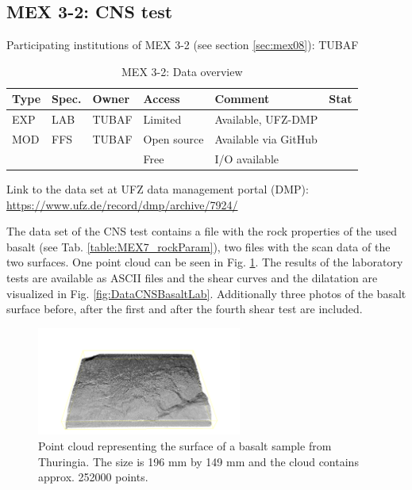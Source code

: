 \subsection{MEX 3-2: CNS test}
\label{DataManMex3-2CNS}

Participating institutions of MEX 3-2 (see section \ref{sec:mex08}): TUBAF

\begin{table}[ht!]
\caption{MEX 3-2: Data overview}
\label{tab:dms-mex32-overview}
\small
\begin{tabular}{l|l|l|l|L{4.7cm}|l}
\hline
{}
Type & Spec. & Owner & Access     & Comment                 & Stat \\ 
\hline 
EXP  & LAB   & TUBAF & Limited    & Available, UFZ-DMP      &  \\
\hline \hline
MOD  & FFS   & TUBAF & Open source & Available via GitHub   &  \\
     &       &       & Free       & I/O available           &  \\
\hline
\end{tabular}
\end{table}
\normalsize

Link to the data set at UFZ data management portal (DMP): \\ \url{https://www.ufz.de/record/dmp/archive/7924/}

The data set of the CNS test contains a file with the rock properties of the used basalt (see Tab. \ref{table:MEX7_rockParam}), two files with the scan data of the two surfaces. One point cloud can be seen in Fig. \ref{fig:DataCNSBasaltPointCloud}. The results of the laboratory tests are available as ASCII files and the shear curves and the dilatation are visualized in Fig. \ref{fig:DataCNSBasaltLab}. Additionally three photos of the basalt surface before, after the first and after the fourth shear test are included. 

\begin{figure}[!ht]
\begin{center}
\includegraphics[width=0.6\textwidth]{./figures/MEX3-2PointCloud.png}
\end{center}
\caption{Point cloud representing the surface of a basalt sample from Thuringia. The size is 196 mm by 149 mm and the cloud contains approx. 252000 points.}
\label{fig:DataCNSBasaltPointCloud}
\end{figure}


